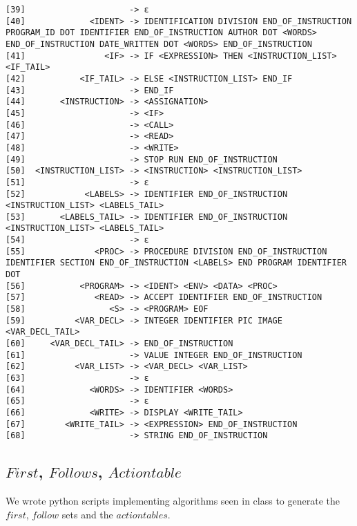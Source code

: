 \begin{verbatim}
[39]                     -> ε
[40]             <IDENT> -> IDENTIFICATION DIVISION END_OF_INSTRUCTION PROGRAM_ID DOT IDENTIFIER END_OF_INSTRUCTION AUTHOR DOT <WORDS> END_OF_INSTRUCTION DATE_WRITTEN DOT <WORDS> END_OF_INSTRUCTION
[41]                <IF> -> IF <EXPRESSION> THEN <INSTRUCTION_LIST> <IF_TAIL>
[42]           <IF_TAIL> -> ELSE <INSTRUCTION_LIST> END_IF
[43]                     -> END_IF
[44]       <INSTRUCTION> -> <ASSIGNATION>
[45]                     -> <IF>
[46]                     -> <CALL>
[47]                     -> <READ>
[48]                     -> <WRITE>
[49]                     -> STOP RUN END_OF_INSTRUCTION
[50]  <INSTRUCTION_LIST> -> <INSTRUCTION> <INSTRUCTION_LIST>
[51]                     -> ε
[52]            <LABELS> -> IDENTIFIER END_OF_INSTRUCTION <INSTRUCTION_LIST> <LABELS_TAIL>
[53]       <LABELS_TAIL> -> IDENTIFIER END_OF_INSTRUCTION <INSTRUCTION_LIST> <LABELS_TAIL>
[54]                     -> ε
[55]              <PROC> -> PROCEDURE DIVISION END_OF_INSTRUCTION IDENTIFIER SECTION END_OF_INSTRUCTION <LABELS> END PROGRAM IDENTIFIER DOT
[56]           <PROGRAM> -> <IDENT> <ENV> <DATA> <PROC>
[57]              <READ> -> ACCEPT IDENTIFIER END_OF_INSTRUCTION
[58]                 <S> -> <PROGRAM> EOF
[59]          <VAR_DECL> -> INTEGER IDENTIFIER PIC IMAGE <VAR_DECL_TAIL>
[60]     <VAR_DECL_TAIL> -> END_OF_INSTRUCTION
[61]                     -> VALUE INTEGER END_OF_INSTRUCTION
[62]          <VAR_LIST> -> <VAR_DECL> <VAR_LIST>
[63]                     -> ε
[64]             <WORDS> -> IDENTIFIER <WORDS>
[65]                     -> ε
[66]             <WRITE> -> DISPLAY <WRITE_TAIL>
[67]        <WRITE_TAIL> -> <EXPRESSION> END_OF_INSTRUCTION
[68]                     -> STRING END_OF_INSTRUCTION

\end{verbatim}

\subsection{$First$, $Follows$, $Action table$}

We wrote python scripts implementing algorithms seen in class to generate the $first$, $follow$ sets and the $action tables$.

